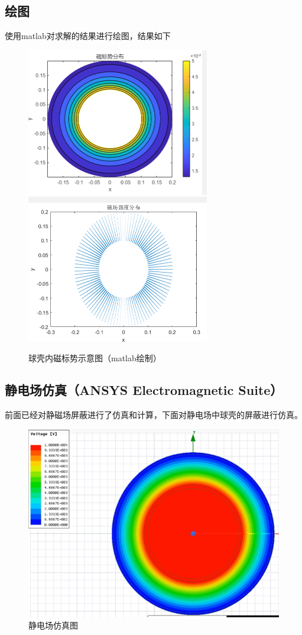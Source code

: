 \documentclass{article}
\begin{document}
\subsection{绘图}
使用matlab对求解的结果进行绘图，结果如下
        \begin{figure}[H]
            \centering
            \includegraphics[width=8cm]{img/3.png}
            \includegraphics[width=8cm]{img/4.png}
\caption{球壳内磁标势示意图（matlab绘制）}
            \end{figure}
\subsection{静电场仿真（ANSYS Electromagnetic Suite）}
前面已经对静磁场屏蔽进行了仿真和计算，下面对静电场中球壳的屏蔽进行仿真。
        \begin{figure}[H]
            \centering
            \includegraphics[width=12cm]{img/18.png}
          \caption{静电场仿真图}  
          \end{figure}
\end{document}
